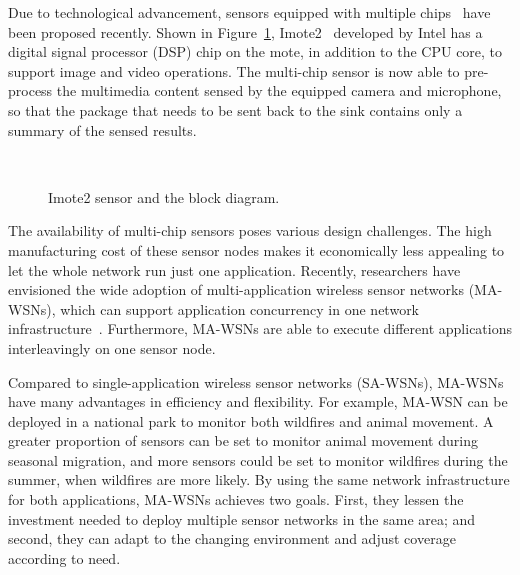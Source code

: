 Due to technological advancement, sensors equipped with multiple chips~\cite{imote2} have been proposed recently. Shown 
in Figure~\ref{fig:imote2}, Imote2~\cite{imote2} developed by Intel has a digital signal processor (DSP) chip on the 
mote, in addition to the CPU core, to support image and video operations. The multi-chip sensor is now able to 
pre-process the multimedia content sensed by the equipped camera and microphone, so that the package that needs to be 
sent back to the sink contains only a summary of the sensed results.

\begin{figure}[h]
\centering
\mbox{
	\hspace{20mm}
      }
\caption{Imote2 sensor and the block diagram.}
\label{fig:imote2}
\end{figure}

The availability of multi-chip sensors poses various design challenges. The high manufacturing cost of these sensor 
nodes makes it economically less appealing to let the whole network run just one application. Recently, researchers 
have envisioned the wide adoption of multi-application wireless sensor networks (MA-WSNs), which can support 
application concurrency in one network infrastructure~\cite{melete,ma-wsns}. Furthermore, MA-WSNs are able to 
execute different applications interleavingly on one sensor node.

Compared to single-application wireless sensor networks (SA-WSNs), MA-WSNs have many advantages in efficiency and 
flexibility.
For example, MA-WSN can be deployed in a national park to monitor both wildfires and animal movement. A greater 
proportion of sensors can be set to monitor animal movement during seasonal migration, and more sensors could be set to 
monitor wildfires during the summer, when wildfires are more likely. By using the same network infrastructure for both 
applications, MA-WSNs achieves two goals. First, they lessen the investment needed to deploy multiple sensor networks 
in the same area; and second, they can adapt to the changing environment and adjust coverage according to need.

